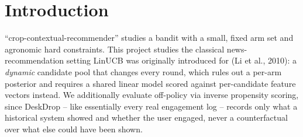 \section{Introduction}
``crop-contextual-recommender'' studies a bandit with a small, fixed arm
set and agronomic hard constraints. This project studies the classical
news-recommendation setting LinUCB was originally introduced for (Li et
al., 2010): a \emph{dynamic} candidate pool that changes every round, which
rules out a per-arm posterior and requires a shared linear model scored
against per-candidate feature vectors instead. We additionally evaluate
off-policy via inverse propensity scoring, since DeskDrop -- like essentially
every real engagement log -- records only what a historical system showed
and whether the user engaged, never a counterfactual over what else could
have been shown.
